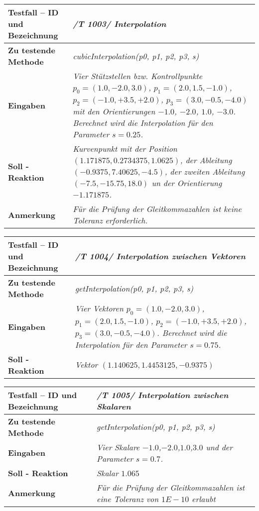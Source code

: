 \begin{longtable}{|p{7cm}|p{10cm}|}
\hline
\textbf{Testfall -- ID und Bezeichnung} & \textit{ /T 1003/ Interpolation} \\
\hline
\textbf{Zu testende Methode} &  \textit{cubicInterpolation(p0, p1, p2, p3, s)} \\
\hline
\textbf{Eingaben} & \textit{Vier Stützstellen bzw. Kontrollpunkte $p_0 = (1.0, -2.0, 3.0)$,
$p_1 = (2.0, 1.5, -1.0)$, $p_2 = (-1.0, +3.5, +2.0)$, $p_3 = (3.0, -0.5, -4.0)$ mit den
Orientierungen $-1.0$, $-2.0$, $1.0$, $-3.0$. Berechnet wird die Interpolation für
den Parameter $s = 0.25$.}\\
\hline
\textbf{Soll - Reaktion} & \textit{Kurvenpunkt mit der Position $(1.171875, 0.2734375, 1.0625)$,
 der Ableitung $(-0.9375,7.40625, -4.5)$, der zweiten Ableitung $(-7.5, -15.75, 18.0)$
 un der Orientierung $-1.171875$.}\\
\hline
\textbf{Anmerkung} & \textit{Für die Prüfung der Gleitkommazahlen ist keine 
Toleranz erforderlich.} \\
\hline
\end{longtable}

\begin{longtable}{|p{7cm}|p{10cm}|}
\hline
\textbf{Testfall -- ID und Bezeichnung} & \textit{ /T 1004/ Interpolation zwischen Vektoren} \\
\hline
\textbf{Zu testende Methode} &  \textit{getInterpolation(p0, p1, p2, p3, s)} \\
\hline
\textbf{Eingaben} & \textit{Vier Vektoren $p_0 = (1.0, -2.0, 3.0)$,
$p_1 = (2.0, 1.5, -1.0)$, $p_2 = (-1.0, +3.5, +2.0)$, $p_3 = (3.0, -0.5, -4.0)$. 
Berechnet wird die Interpolation für den Parameter $s = 0.75$.}\\
\hline
\textbf{Soll - Reaktion} & \textit{Vektor $(1.140625, 1.4453125, -0.9375)$}\\
\hline
\end{longtable}

\begin{longtable}{|p{7cm}|p{10cm}|}
\hline
\textbf{Testfall -- ID und Bezeichnung} & \textit{ /T 1005/ Interpolation zwischen Skalaren} \\
\hline
\textbf{Zu testende Methode} &  \textit{getInterpolation(p0, p1, p2, p3, s)} \\
\hline
\textbf{Eingaben} & \textit{Vier Skalare $-1.0$,$-2.0$,$1.0$,$3.0$ und der Parameter $s=0.7$.}\\
\hline
\textbf{Soll - Reaktion} & \textit{Skalar $1.065$}\\
\hline
\textbf{Anmerkung} & \textit{Für die Prüfung der Gleitkommazahlen ist eine 
Toleranz von $1E-10$ erlaubt} \\
\hline
\end{longtable}

